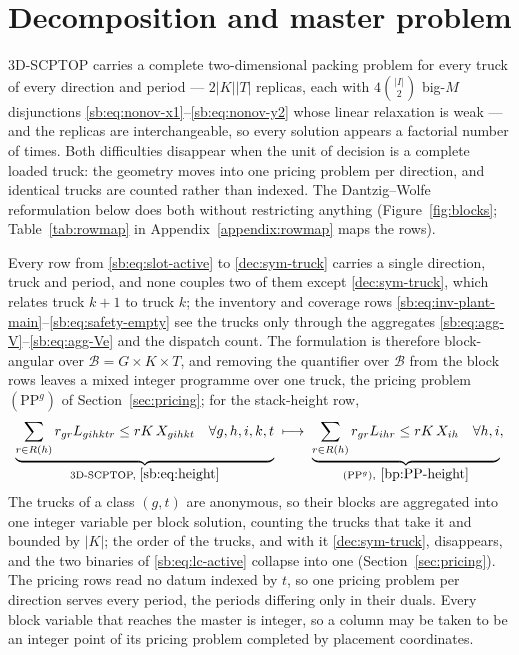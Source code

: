 \section{Decomposition and master problem}
\label{sec:decomp}

3D-SCPTOP carries a complete two-dimensional packing problem for every
truck of every direction and period --- $2|K||T|$ replicas, each with
$4\binom{|I|}{2}$ big-$M$ disjunctions
\eqref{sb:eq:nonov-x1}--\eqref{sb:eq:nonov-y2} whose linear relaxation
is weak --- and the replicas are interchangeable, so every solution
appears a factorial number of times. Both difficulties disappear when
the unit of decision is a complete loaded truck: the geometry moves into
one pricing problem per direction, and identical trucks are counted
rather than indexed. The Dantzig--Wolfe reformulation below
\autocite{DantzigWolfe1960,Barnhart1998BranchAndPrice,Desaulniers2005ColumnGeneration}
does both without restricting anything (Figure~\ref{fig:blocks};
Table~\ref{tab:rowmap} in Appendix~\ref{appendix:rowmap} maps the rows).



Every row from \eqref{sb:eq:slot-active} to \eqref{dec:sym-truck}
carries a single direction, truck and period, and none couples two of
them except \eqref{dec:sym-truck}, which relates truck $k+1$ to truck
$k$; the inventory and coverage rows
\eqref{sb:eq:inv-plant-main}--\eqref{sb:eq:safety-empty} see the
trucks only through the aggregates
\eqref{sb:eq:agg-V}--\eqref{sb:eq:agg-Ve} and the dispatch count. The
formulation is therefore block-angular over $\mathcal{B}=G\times
K\times T$, and removing the quantifier over $\mathcal{B}$ from the
block rows leaves a mixed integer programme over one truck, the pricing
problem $(\mathrm{PP}^{g})$ of Section~\ref{sec:pricing}; for the
stack-height row,
\begin{equation}
\underbrace{\sum_{r\in R(h)} r_{gr}L_{gihktr}\le rK\,X_{gihkt}
  \quad\forall g,h,i,k,t}_{\text{3D-SCPTOP, }\eqref{sb:eq:height}}
\;\longmapsto\;
\underbrace{\sum_{r\in R(h)} r_{gr}L_{ihr}\le rK\,X_{ih}
  \quad\forall h,i}_{(\mathrm{PP}^{g}),\ \eqref{bp:PP-height}},
\label{eq:deletequant}
\end{equation}
The trucks of a class $(g,t)$ are anonymous, so their blocks are
aggregated into one integer variable per block solution, counting the
trucks that take it and bounded by $|K|$; the order of the trucks, and
with it \eqref{dec:sym-truck}, disappears, and the two binaries of
\eqref{sb:eq:lc-active} collapse into one (Section~\ref{sec:pricing}).
The pricing rows read no datum indexed by $t$, so one pricing problem
per direction serves every period, the periods differing only in their
duals. Every block variable that reaches the master is integer, so a
column may be taken to be an integer point of its pricing problem
completed by placement coordinates.
